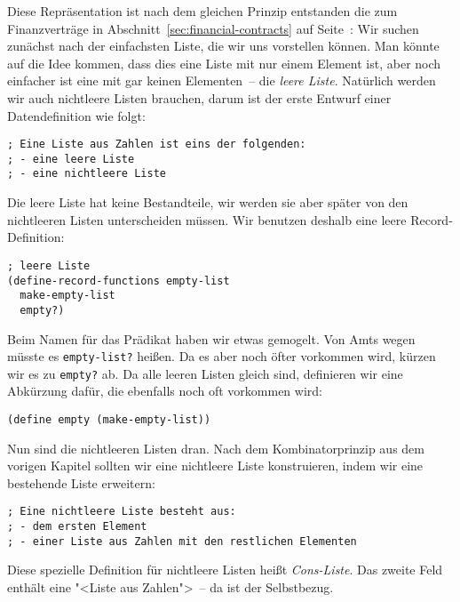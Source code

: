 Diese Repräsentation ist nach dem gleichen Prinzip entstanden die zum
Finanzverträge in Abschnitt~\ref{sec:financial-contracts} auf
Seite~\pageref{sec:financial-contracts}: Wir suchen zunächst nach der
einfachsten Liste, die wir uns vorstellen können.  Man könnte auf die
Idee kommen, dass dies eine Liste mit nur einem Element ist, aber noch
einfacher ist eine mit gar keinen Elementen~-- die \textit{leere
  Liste}.  Natürlich werden
wir auch nichtleere Listen brauchen, darum ist der erste Entwurf
einer Datendefinition wie folgt:
%
\begin{lstlisting}
; Eine Liste aus Zahlen ist eins der folgenden:
; - eine leere Liste
; - eine nichtleere Liste
\end{lstlisting}
%
Die leere Liste hat keine Bestandteile, wir werden sie
aber später von den nichtleeren Listen unterscheiden müssen.  Wir
benutzen deshalb eine leere Record-Definition:
%
\begin{lstlisting}
; leere Liste
(define-record-functions empty-list
  make-empty-list
  empty?)
\end{lstlisting}
%
Beim Namen für das Prädikat haben wir etwas gemogelt.  Von Amts wegen
müsste es \lstinline{empty-list?} heißen.  Da es aber noch öfter
vorkommen wird, kürzen wir es zu \lstinline{empty?} ab. Da alle leeren
Listen gleich sind, definieren wir eine Abkürzung dafür, die ebenfalls
noch oft vorkommen wird:
%
\begin{lstlisting}
(define empty (make-empty-list))
\end{lstlisting}
%
Nun sind die nichtleeren Listen dran.  Nach dem Kombinatorprinzip aus dem
vorigen Kapitel sollten wir eine nichtleere Liste konstruieren, indem
wir eine bestehende Liste erweitern:
%
\begin{lstlisting}
; Eine nichtleere Liste besteht aus:
; - dem ersten Element
; - einer Liste aus Zahlen mit den restlichen Elementen
\end{lstlisting}
%
Diese spezielle Definition für nichtleere Listen heißt
\textit{Cons-Liste}.  Das zweite Feld enthält
eine "<Liste aus Zahlen">~-- da ist der Selbstbezug.


